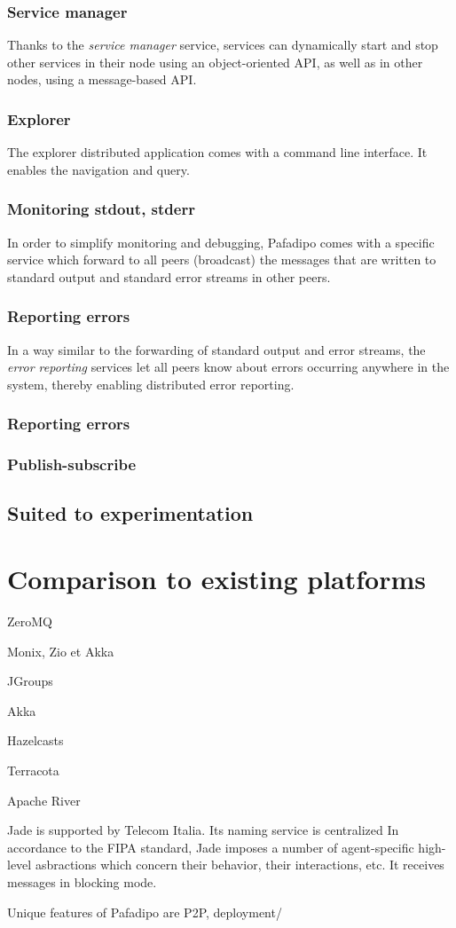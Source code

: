 \documentclass{article}
\begin{document}
\subsubsection{Service manager}

Thanks to the \textit{service manager} service, services can dynamically start and stop other services in their node using an object-oriented API, as well as in other nodes, using a message-based API. 

\subsubsection{Explorer}

The explorer distributed application comes with a command line interface.
It enables the navigation and query.

\subsubsection{Monitoring stdout, stderr}
In order to simplify monitoring and debugging, Pafadipo comes with a specific service which forward to all peers (broadcast)  the messages that are written to standard output and standard error streams in other peers.

\subsubsection{Reporting errors}
In a way similar to the forwarding of standard output and error streams, the \textit{error reporting} services let all peers know about errors occurring anywhere in the system, thereby enabling distributed error reporting.
\subsubsection{Reporting errors}


\subsubsection{Publish-subscribe}


\subsection{Suited to experimentation}



\section{Comparison to existing platforms}
ZeroMQ

Monix, Zio et Akka

JGroups

Akka

Hazelcasts

Terracota

Apache River

Jade is supported by Telecom Italia.
Its naming service is centralized
In accordance to the FIPA standard, Jade imposes a number of agent-specific high-level asbractions which concern their behavior, their interactions, etc.
It receives messages in blocking mode.

Unique features of Pafadipo are P2P, deployment/
\end{document}
